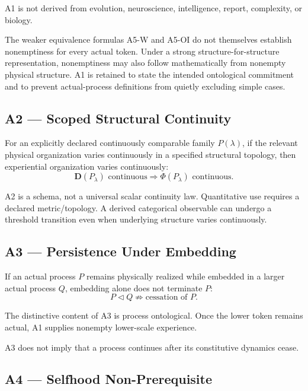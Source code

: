 \documentclass[
  11pt,
  a4paper,
]{article}
\begin{document}
A1 is not derived from evolution, neuroscience, intelligence, report,
complexity, or biology.

The weaker equivalence formulas A5-W and A5-OI do not themselves
establish nonemptiness for every actual token. Under a strong
structure-for-structure representation, nonemptiness may also follow
mathematically from nonempty physical structure. A1 is retained to state
the intended ontological commitment and to prevent actual-process
definitions from quietly excluding simple cases.

\hypertarget{a2-scoped-structural-continuity}{%
\subsection{A2 --- Scoped Structural
Continuity}\label{a2-scoped-structural-continuity}}

For an explicitly declared continuously comparable family
\(P(\lambda)\), if the relevant physical organization varies
continuously in a specified structural topology, then experiential
organization varies continuously:
\nopagebreak[4]
\[
\boxed{
\mathbf D(P_\lambda)\text{ continuous}
\Rightarrow
\Phi(P_\lambda)\text{ continuous}.
}
\]

A2 is a schema, not a universal scalar continuity law. Quantitative use
requires a declared metric/topology. A derived categorical observable
can undergo a threshold transition even when underlying structure varies
continuously.

\hypertarget{a3-persistence-under-embedding}{%
\subsection{A3 --- Persistence Under
Embedding}\label{a3-persistence-under-embedding}}

If an actual process \(P\) remains physically realized while embedded in
a larger actual process \(Q\), embedding alone does not terminate \(P\):
\nopagebreak[4]
\[
\boxed{
P\triangleleft Q
\not\Rightarrow
\text{cessation of }P.
}
\]

The distinctive content of A3 is process ontological. Once the lower
token remains actual, A1 supplies nonempty lower-scale experience.

A3 does not imply that a process continues after its constitutive
dynamics cease.

\hypertarget{a4-selfhood-non-prerequisite}{%
\subsection{A4 --- Selfhood
Non-Prerequisite}\label{a4-selfhood-non-prerequisite}}
\end{document}
